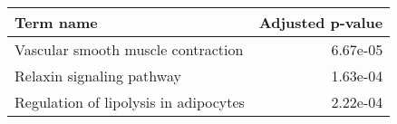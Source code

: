 \begin{tabular}{lr}
\toprule
                            Term name &  Adjusted p-value \\
\midrule
   Vascular smooth muscle contraction &          6.67e-05 \\
            Relaxin signaling pathway &          1.63e-04 \\
Regulation of lipolysis in adipocytes &          2.22e-04 \\
\bottomrule
\end{tabular}
